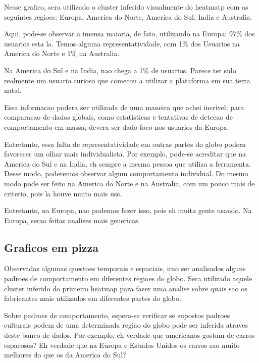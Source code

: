 \documentclass[10pt, conference]{IEEEtran}
\begin{document}
Nesse grafico, sera utilizado o cluster inferido visualmente do heatmatp com as seguintes
regioes: Europa, America do Norte, America do Sul, India e Australia.

Aqui, pode-se observar a imensa maioria, de fato, utilizando na Europa: 97\% dos usuarios
esta la. Temos alguma representatividade, com 1\% dos Usuarios na America do Norte e 1\% 
na Australia.

Na America do Sul e na India, nao chega a 1\% de usuarios. Parece ter sido realmente um usuario
curioso que comecou a utilizar a plataforma em sua terra natal.

Essa informacao podera ser utilizada de uma maneira que achei incrivel: para comparacao de
dados globais, como estatisticas e tentativas de detecao de comportamento em massa, devera
ser dado foco nos usuarios da Europa.

Entretanto, essa falta de representatividade em outras partes do globo podera favorecer um
olhar mais individualista. Por exemplo, pode-se acreditar que na America do Sul e na India,
eh sempre a mesma pessoa que utiliza a ferramenta. Desse modo, poderemos observar algum
comportamento individual. Do mesmo modo pode ser feito na America do Norte e na Australia,
com um pouco mais de criterio, pois la houve muito mais uso.

Entretanto, na Europa, nao podemos fazer isso, pois eh muita gente usando. Na Europa, serao
feitas analises mais genericas.




\subsection{Graficos em pizza}

Observadas algumas questoes temporais e espaciais, irao ser analisados alguns padroes de comportamento
em diferentes regioes do globo. Sera utilizado aquele cluster inferido do primeiro heatmap para
fazer uma analise sobre quais sao os fabricantes mais utilizados em diferentes partes do globo.

Sobre padroes de comportamento, espera-se verificar se supostos padroes culturais podem de uma determinada
regiao do globo pode ser inferida atraves deste banco de dados. Por exemplo, eh verdade que americanos
gostam de carros espacosos? Eh verdade que na Europa e Estados Unidos os carros sao muito melhores
do que os da America do Sul?
\end{document}
